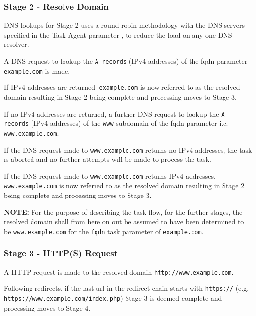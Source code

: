 \documentclass{mscreport}
\begin{document}
\subsubsection{Stage 2 - Resolve Domain}

DNS lookups for Stage 2 uses a round robin methodology with the DNS servers specified in the Task Agent parameter \texttt{}, to reduce the load on any one DNS resolver.

\vspace{0.3cm} \noindent
A DNS request to lookup the \texttt{A records} (IPv4 addresses) of the fqdn parameter \texttt{example.com} is made.

\vspace{0.3cm} \noindent
If IPv4 addresses are returned, \texttt{example.com} is now referred to as the resolved domain resulting in Stage 2 being complete and processing moves to Stage 3.

\vspace{0.3cm} \noindent
If no IPv4 addresses are returned, a further DNS request to lookup the \texttt{A records} (IPv4 addresses) of the \texttt{www} subdomain of the fqdn parameter i.e. \texttt{www.example.com}.

\vspace{0.3cm} \noindent
If the DNS request made to \texttt{www.example.com} returns no IPv4 addresses, the task is aborted and no further attempts will be made to process the task.

\vspace{0.3cm} \noindent
If the DNS request made to \texttt{www.example.com} returns IPv4 addresses, \texttt{www.example.com} is now referred to as the resolved domain resulting in Stage 2 being complete and processing moves to Stage 3.

\vspace{0.3cm} \noindent
\textbf{NOTE:} For the purpose of describing the task flow, for the further stages, the resolved domain shall from here on out be assumed to have been determined to be \texttt{www.example.com} for the \texttt{fqdn} task parameter of \texttt{example.com}.

\subsubsection{Stage 3 - HTTP(S) Request}

A HTTP request is made to the resolved domain \texttt{http://www.example.com}.

\vspace{0.3cm} \noindent
Following redirects, if the last url in the redirect chain starts with \newline \texttt{https://} (e.g. \texttt{https://www.example.com/index.php}) Stage 3 is deemed complete and processing moves to Stage 4.
\end{document}

